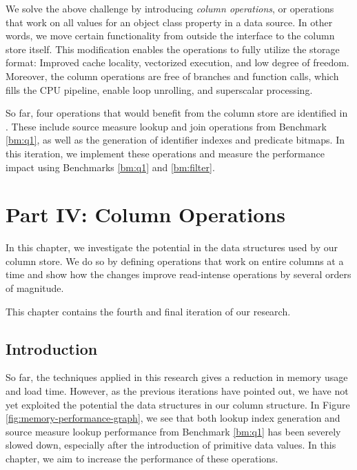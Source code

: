 We solve the above challenge by introducing \textit{column operations}, or operations that work on all values for an object class property in a data source. In other words, we move certain functionality from outside the  interface to the column store itself. This modification enables the operations to fully utilize the storage format: Improved cache locality, vectorized execution, and low degree of freedom. Moreover, the column operations are free of branches and function calls, which fills the CPU pipeline, enable loop unrolling, and superscalar processing.

So far, four operations that would benefit from the column store are identified in \gap. These include source measure lookup and join operations from Benchmark \ref{bm:q1}, as well as the generation of identifier indexes and predicate bitmaps. In this iteration, we implement these operations and measure the performance impact using Benchmarks \ref{bm:q1} and \ref{bm:filter}.

\chapter{Part IV: Column Operations}
\label{chap:operations}

In this chapter, we investigate the potential in the data structures used by our column store. We do so by defining operations that work on entire columns at a time and show how the changes improve read-intense operations by several orders of magnitude.

This chapter contains the fourth and final iteration of our research.

\clearpage

\section{Introduction}
\label{sec:Introduction}
So far, the techniques applied in this research gives a reduction in memory usage and load time. However, as the previous iterations have pointed out, we have not yet exploited the potential the data structures in our column structure. In Figure \ref{fig:memory-performance-graph}, we see that both lookup index generation and source measure lookup performance from Benchmark \ref{bm:q1} has been severely slowed down, especially after the introduction of primitive data values. In this chapter, we aim to increase the performance of these operations.

